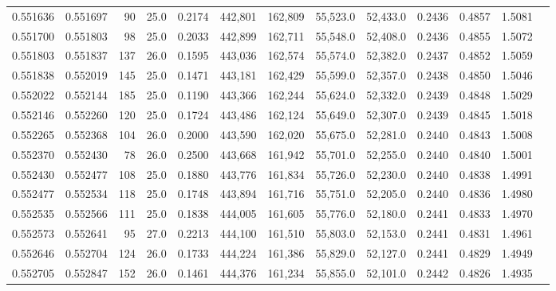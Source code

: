 \begin{tabular}{rrrrrrrrrrrrr}
0.551636 & 0.551697 &    90 & 25.0 &                                     0.2174 & 442,801 & 162,809 &  55,523.0 &  52,433.0 & 0.2436 & 0.4857 & 1.5081 \\
0.551700 & 0.551803 &    98 & 25.0 &                                     0.2033 & 442,899 & 162,711 &  55,548.0 &  52,408.0 & 0.2436 & 0.4855 & 1.5072 \\
0.551803 & 0.551837 &   137 & 26.0 &                                     0.1595 & 443,036 & 162,574 &  55,574.0 &  52,382.0 & 0.2437 & 0.4852 & 1.5059 \\
0.551838 & 0.552019 &   145 & 25.0 &                                     0.1471 & 443,181 & 162,429 &  55,599.0 &  52,357.0 & 0.2438 & 0.4850 & 1.5046 \\
0.552022 & 0.552144 &   185 & 25.0 &                                     0.1190 & 443,366 & 162,244 &  55,624.0 &  52,332.0 & 0.2439 & 0.4848 & 1.5029 \\
0.552146 & 0.552260 &   120 & 25.0 &                                     0.1724 & 443,486 & 162,124 &  55,649.0 &  52,307.0 & 0.2439 & 0.4845 & 1.5018 \\
0.552265 & 0.552368 &   104 & 26.0 &                                     0.2000 & 443,590 & 162,020 &  55,675.0 &  52,281.0 & 0.2440 & 0.4843 & 1.5008 \\
0.552370 & 0.552430 &    78 & 26.0 &                                     0.2500 & 443,668 & 161,942 &  55,701.0 &  52,255.0 & 0.2440 & 0.4840 & 1.5001 \\
0.552430 & 0.552477 &   108 & 25.0 &                                     0.1880 & 443,776 & 161,834 &  55,726.0 &  52,230.0 & 0.2440 & 0.4838 & 1.4991 \\
0.552477 & 0.552534 &   118 & 25.0 &                                     0.1748 & 443,894 & 161,716 &  55,751.0 &  52,205.0 & 0.2440 & 0.4836 & 1.4980 \\
0.552535 & 0.552566 &   111 & 25.0 &                                     0.1838 & 444,005 & 161,605 &  55,776.0 &  52,180.0 & 0.2441 & 0.4833 & 1.4970 \\
0.552573 & 0.552641 &    95 & 27.0 &                                     0.2213 & 444,100 & 161,510 &  55,803.0 &  52,153.0 & 0.2441 & 0.4831 & 1.4961 \\
0.552646 & 0.552704 &   124 & 26.0 &                                     0.1733 & 444,224 & 161,386 &  55,829.0 &  52,127.0 & 0.2441 & 0.4829 & 1.4949 \\
0.552705 & 0.552847 &   152 & 26.0 &                                     0.1461 & 444,376 & 161,234 &  55,855.0 &  52,101.0 & 0.2442 & 0.4826 & 1.4935 \\

\end{tabular}
